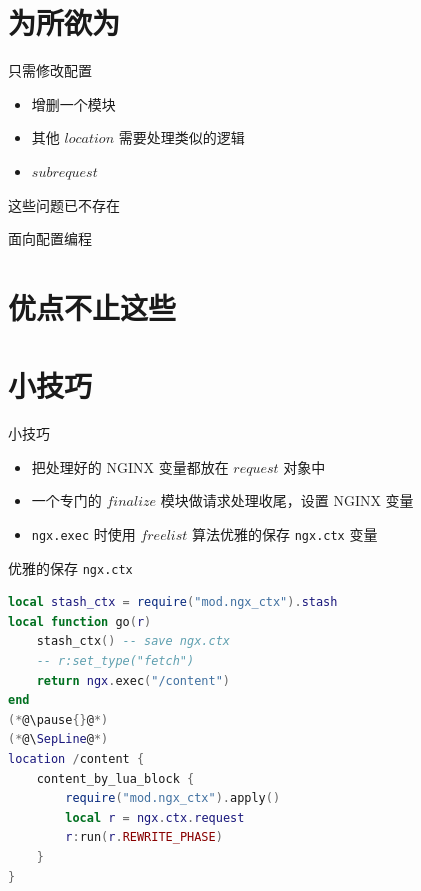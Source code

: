 \documentclass[aspectratio=32]{beamer}
\begin{document}
\section{为所欲为}

\begin{frame}{只需修改配置}
\begin{itemize}
  \item \alert{增删}一个模块
  \item 其他 $location$ 需要处理\alert{类似}的逻辑
  \item $subrequest$
\end{itemize}
\pause{}
\centerline{\LARGE 这些问题已不存在}
\end{frame}

\begin{frame}[standout]
面向配置编程
\end{frame}

\section{优点不止这些}

\begin{frame}[standout]
\end{frame}

\section{小技巧}

\begin{frame}{小技巧}
\begin{itemize}
  \item 把处理好的 NGINX 变量都放在 $request$ 对象中
  \item 一个专门的 $finalize$ 模块做请求处理收尾，设置 NGINX 变量
  \item \lstinline|ngx.exec| 时使用 $freelist$ 算法优雅的保存 \lstinline|ngx.ctx| 变量
\end{itemize}
\end{frame}

\begin{frame}[fragile]{优雅的保存 \lstinline|ngx.ctx|}
\small
\begin{lstlisting}[language=lua]
local stash_ctx = require("mod.ngx_ctx").stash
local function go(r)
    stash_ctx() -- save ngx.ctx
    -- r:set_type("fetch")
    return ngx.exec("/content")
end
(*@\pause{}@*)
(*@\SepLine@*)
location /content {
    content_by_lua_block {
        require("mod.ngx_ctx").apply()
        local r = ngx.ctx.request
        r:run(r.REWRITE_PHASE)
    }
}
\end{lstlisting}
\end{frame}
\end{document}
